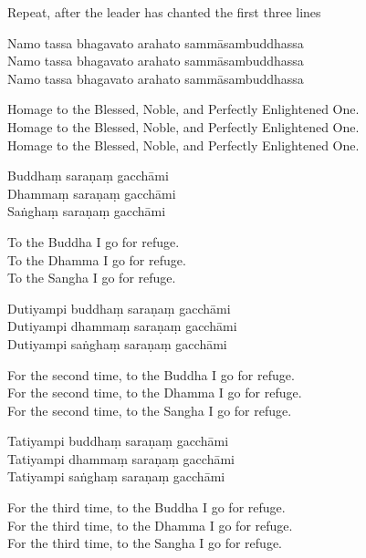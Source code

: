 \begin{instruction}
  Repeat, after the leader has chanted the first three lines
\end{instruction}

Namo tassa bhagavato arahato sammāsambuddhassa\\
Namo tassa bhagavato arahato sammāsambuddhassa\\
Namo tassa bhagavato arahato sammāsambuddhassa

\begin{english}
  Homage to the Blessed, Noble, and Perfectly Enlightened One.\\
  Homage to the Blessed, Noble, and Perfectly Enlightened One.\\
  Homage to the Blessed, Noble, and Perfectly Enlightened One.
\end{english}

Buddhaṃ saraṇaṃ gacchāmi\\
Dhammaṃ saraṇaṃ gacchāmi\\
Saṅghaṃ saraṇaṃ gacchāmi

\begin{english}
  To the Buddha I go for refuge.\\
  To the Dhamma I go for refuge.\\
  To the Sangha I go for refuge.
\end{english}

Dutiyampi buddhaṃ saraṇaṃ gacchāmi\\
Dutiyampi dhammaṃ saraṇaṃ gacchāmi\\
Dutiyampi saṅghaṃ saraṇaṃ gacchāmi

\begin{english}
  For the second time, to the Buddha I go for refuge.\\
  For the second time, to the Dhamma I go for refuge.\\
  For the second time, to the Sangha I go for refuge.
\end{english}

Tatiyampi buddhaṃ saraṇaṃ gacchāmi\\
Tatiyampi dhammaṃ saraṇaṃ gacchāmi\\
Tatiyampi saṅghaṃ saraṇaṃ gacchāmi

\clearpage

\begin{english}
  For the third time, to the Buddha I go for refuge.\\
  For the third time, to the Dhamma I go for refuge.\\
  For the third time, to the Sangha I go for refuge.
\end{english}

